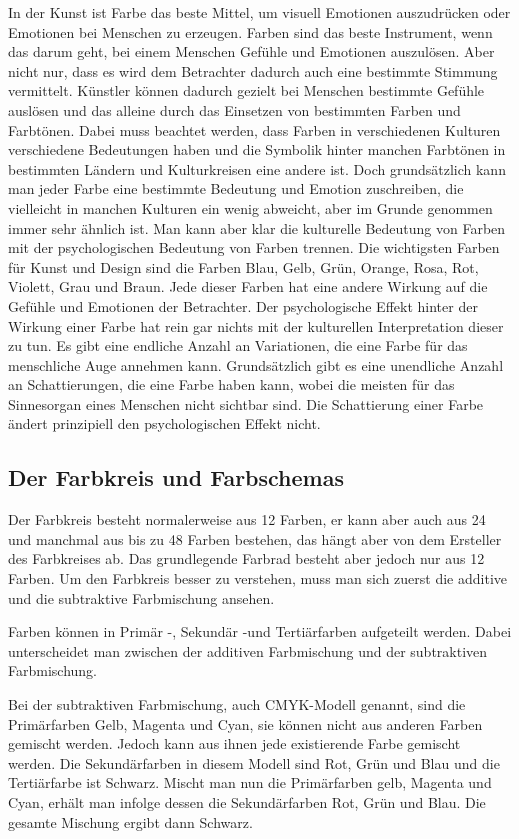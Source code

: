 In der Kunst ist Farbe das beste Mittel, um visuell Emotionen auszudrücken oder Emotionen bei Menschen zu erzeugen. Farben sind das beste Instrument, wenn das darum geht, bei einem Menschen Gefühle und Emotionen auszulösen. Aber nicht nur, dass es wird dem Betrachter dadurch auch eine bestimmte Stimmung vermittelt. Künstler können dadurch gezielt bei Menschen bestimmte Gefühle auslösen und das alleine durch das Einsetzen von bestimmten Farben und Farbtönen.
Dabei muss beachtet werden, dass Farben in verschiedenen Kulturen verschiedene Bedeutungen haben und die Symbolik hinter manchen Farbtönen in bestimmten Ländern und Kulturkreisen eine andere ist. Doch grundsätzlich kann man jeder Farbe eine bestimmte Bedeutung und Emotion zuschreiben, die vielleicht in manchen Kulturen ein wenig abweicht, aber im Grunde genommen immer sehr ähnlich ist.
Man kann aber klar die kulturelle Bedeutung von Farben mit der psychologischen Bedeutung von Farben trennen. Die wichtigsten Farben für Kunst und Design sind die Farben Blau, Gelb, Grün, Orange, Rosa, Rot, Violett, Grau und Braun. Jede dieser Farben hat eine andere Wirkung auf die Gefühle und Emotionen der Betrachter. Der psychologische Effekt hinter der Wirkung einer Farbe hat rein gar nichts mit der kulturellen Interpretation dieser zu tun. 
Es gibt eine endliche Anzahl an Variationen, die eine Farbe für das menschliche Auge annehmen kann. Grundsätzlich gibt es eine unendliche Anzahl an Schattierungen, die eine Farbe haben kann, wobei die meisten für das Sinnesorgan eines Menschen nicht sichtbar sind. Die Schattierung einer Farbe ändert prinzipiell den psychologischen Effekt nicht.


\subsection{Der Farbkreis und Farbschemas}
Der Farbkreis besteht normalerweise aus 12 Farben, er kann aber auch aus 24 und manchmal aus bis zu 48 Farben bestehen, das hängt aber von dem Ersteller des Farbkreises ab. Das grundlegende Farbrad besteht aber jedoch nur aus 12 Farben. Um den Farbkreis besser zu verstehen, muss man sich zuerst die additive und die subtraktive Farbmischung ansehen.  

Farben können in Primär -, Sekundär -und Tertiärfarben aufgeteilt werden. Dabei unterscheidet man zwischen der additiven Farbmischung und der subtraktiven Farbmischung. 

Bei der subtraktiven Farbmischung, auch CMYK-Modell genannt, sind die Primärfarben Gelb, Magenta und Cyan, sie können nicht aus anderen Farben gemischt werden. Jedoch kann aus ihnen jede existierende Farbe gemischt werden. Die Sekundärfarben in diesem Modell sind Rot, Grün und Blau und die Tertiärfarbe ist Schwarz. Mischt man nun die Primärfarben gelb, Magenta und Cyan, erhält man infolge dessen die Sekundärfarben Rot, Grün und Blau. Die gesamte Mischung ergibt dann Schwarz.


